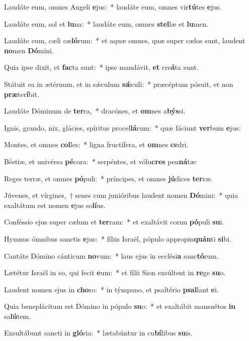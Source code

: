 \item Laudáte eum, omnes Angeli \textbf{e}jus:~* laudáte eum, omnes vir\textbf{tú}tes \textbf{e}jus.
\item Laudáte eum, sol et \textbf{lu}na:~* laudáte eum, omnes \textbf{stel}læ et \textbf{lu}men.
\item Laudáte eum, cæli cæ\textbf{ló}rum:~* et aquæ omnes, quæ super cælos sunt, laudent \textbf{no}men \textbf{Dó}mini.
\item Quia ipse dixit, et \textbf{fac}ta sunt:~* ipse mandávit, \textbf{et} cre\textbf{á}ta sunt.
\item Státuit ea in ætérnum, et in sǽculum \textbf{sǽ}culi:~* præcéptum pósuit, et non \textbf{præ}ter\textbf{í}bit.
\item Laudáte Dóminum de \textbf{ter}ra,~* dracónes, et \textbf{om}nes a\textbf{býs}si.
\item Ignis, grando, nix, glácies, spíritus procel\textbf{lá}rum:~* quæ fáciunt \textbf{ver}bum \textbf{e}jus:
\item Montes, et omnes \textbf{col}les:~* ligna fructífera, et \textbf{om}nes \textbf{ce}dri.
\item Béstiæ, et univérsa \textbf{pé}cora:~* serpéntes, et vólu\textbf{cres} pen\textbf{ná}tæ:
\item Reges terræ, et omnes \textbf{pó}puli:~* príncipes, et omnes \textbf{jú}dices \textbf{ter}ræ.
\item Júvenes, et vírgines,~† senes cum junióribus laudent nomen \textbf{Dó}mini:~* quia exaltátum est nomen \textbf{e}jus so\textbf{lí}us.
\item Conféssio ejus super cælum et \textbf{ter}ram:~* et exaltávit cornu \textbf{pó}puli \textbf{su}i.
\item Hymnus ómnibus sanctis \textbf{e}jus:~* fíliis Israël, pópulo appropin\textbf{quán}ti \textbf{si}bi.
\item Cantáte Dómino cánticum \textbf{no}vum:~* laus ejus in ecclési\textbf{a} sanc\textbf{tó}rum.
\item Lætétur Israël in eo, qui fecit \textbf{e}um:~* et fílii Sion exsúltent in \textbf{re}ge \textbf{su}o.
\item Laudent nomen ejus in \textbf{cho}ro:~* in týmpano, et psaltério \textbf{psal}lant \textbf{e}i.
\item Quia beneplácitum est Dómino in pópulo \textbf{su}o:~* et exaltábit mansuétos \textbf{in} sa\textbf{lú}tem.
\item Exsultábunt sancti in \textbf{gló}ria:~* lætabúntur in cu\textbf{bí}libus \textbf{su}is.
